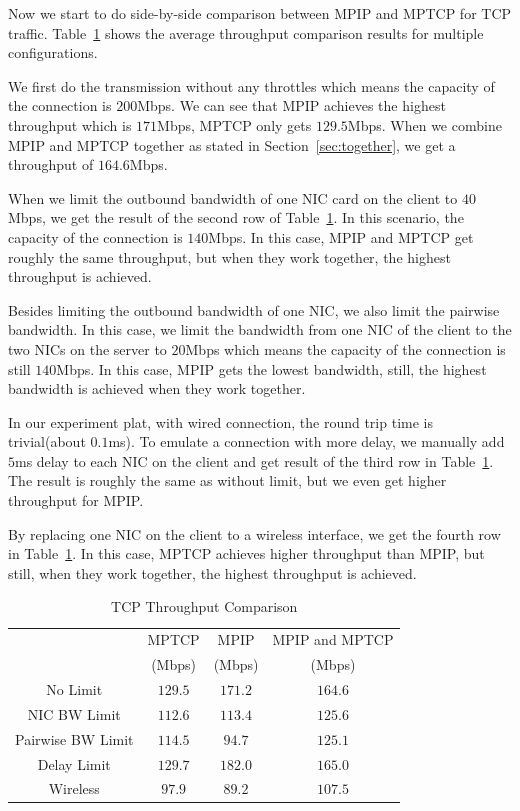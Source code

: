 Now we start to do side-by-side comparison between MPIP and MPTCP for TCP traffic. Table~\ref{tb.tcp} shows the average throughput comparison results for multiple configurations. 

We first do the transmission without any throttles which means the capacity of the connection is $200$Mbps. We can see that MPIP achieves the highest throughput which is $171$Mbps, MPTCP only gets $129.5$Mbps. When we combine MPIP and MPTCP together as stated in Section~\ref{sec:together}, we get a throughput of $164.6$Mbps.

When we limit the outbound bandwidth of one NIC card on the client to $40$Mbps, we get the result of the second row of Table~\ref{tb.tcp}. In this scenario, the capacity of the connection is $140$Mbps. In this case, MPIP and MPTCP get roughly the same throughput, but when they work together, the highest throughput is achieved.

Besides limiting the outbound bandwidth of one NIC, we also limit the pairwise bandwidth. In this case, we limit the bandwidth from one NIC of the client to the two NICs on the server to $20$Mbps which means the capacity of the connection is still $140$Mbps. In this case, MPIP gets the lowest bandwidth, still, the highest bandwidth is achieved when they work together.

In our experiment plat, with wired connection, the round trip time is trivial(about $0.1$ms). To emulate a connection with more delay, we manually add $5$ms delay to each NIC on the client and get result of the third row in Table~\ref{tb.tcp}. The result is roughly the same as without limit, but we even get higher throughput for MPIP.

By replacing one NIC on the client to a wireless interface, we get the fourth row in Table~\ref{tb.tcp}. In this case, MPTCP achieves higher throughput than MPIP, but still, when they work together, the highest throughput is achieved.


\begin{table}
\caption{\label{tb.tcp}TCP Throughput Comparison}
\centering
\begin{tabular}{|c|c|c|c|}
\hline
  & MPTCP &  MPIP &  MPIP and MPTCP  \\
  & (Mbps) &  (Mbps) &  (Mbps)  \\
\hline
No Limit & $129.5$ & $171.2$ & $164.6$  \\
\hline
NIC BW Limit & $112.6$ & $113.4$ & $125.6$  \\
\hline
Pairwise BW Limit & $114.5$ & $94.7$ & $125.1$  \\
\hline
Delay Limit & $129.7$ & $182.0$ & $165.0$  \\
\hline
Wireless & $97.9$ & $89.2$ & $107.5$  \\
\hline
\end{tabular}
\end{table}

